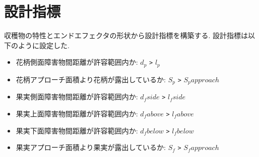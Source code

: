 \section{設計指標}
収穫物の特性とエンドエフェクタの形状から設計指標を構築する.
設計指標は以下のように設定した.

\begin{itemize}
  \item 花柄側面障害物間距離が許容範囲内か: $d_p$ \verb|>| $l_p$
  \item 花柄アプローチ面積より花柄が露出しているか: $S_p$ \verb|>| $S_papproach$
  \item 果実側面障害物間距離が許容範囲内か: $d_fside$ \verb|>| $l_fside$
  \item 果実上面障害物間距離が許容範囲内か: $d_fabove$ \verb|>| $l_fabove$
  \item 果実下面障害物間距離が許容範囲内か: $d_fbelow$ \verb|>| $l_fbelow$
  \item 果実アプローチ面積より果実が露出しているか: $S_f$ \verb|>| $S_fapproach$
\end{itemize}